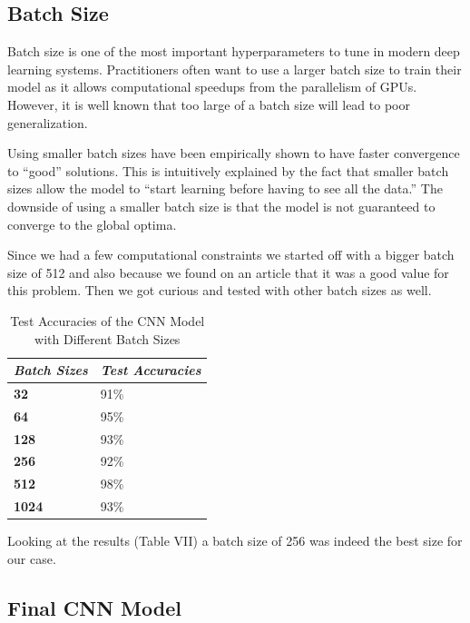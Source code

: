 \documentclass[conference]{IEEEtran}
\begin{document}
\subsection{Batch Size}

Batch size is one of the most important hyperparameters to tune in modern deep learning systems. Practitioners often want to use a larger batch size to train their model as it allows computational speedups from the parallelism of GPUs. However, it is well known that too large of a batch size will lead to poor generalization.

Using smaller batch sizes have been empirically shown to have faster convergence to “good” solutions. This is intuitively explained by the fact that smaller batch sizes allow the model to “start learning before having to see all the data.” The downside of using a smaller batch size is that the model is not guaranteed to converge to the global optima. 

Since we had a few computational constraints we started off with a bigger batch size of 512 and also because we found on an article \cite{analytics} that it was a good value for this problem. Then we got curious and tested with other batch sizes as well.

\begin{table}[htbp]
\caption{Test Accuracies of the CNN Model with Different Batch Sizes}
\begin{center}
\begin{tabular}{|p{2cm}|p{2cm}|}
\hline
\textbf{\textit{Batch Sizes}} & \textbf{\textit{Test Accuracies}} \\
\hline
\textbf{32} & 91\% \\
\hline
\textbf{64} & 95\% \\
\hline
\textbf{128} & 93\% \\
\hline
\textbf{256} & 92\% \\
\hline
\textbf{512} & 98\% \\
\hline
\textbf{1024} & 93\% \\
\hline
\end{tabular}
\end{center}
\end{table}

Looking at the results (Table VII) a batch size of 256 was indeed the best size for our case.

\subsection{Final CNN Model}
\end{document}
